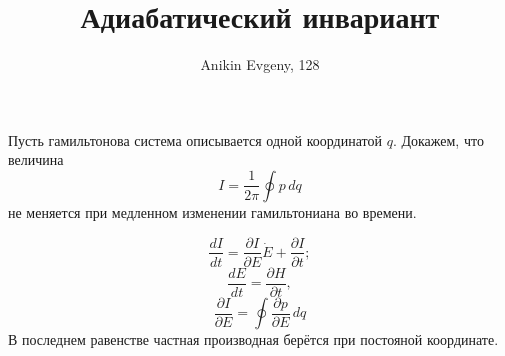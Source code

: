 \documentclass{article}
\title{Адиабатический инвариант}
\author{Anikin Evgeny, 128}
\begin{document}
\maketitle
Пусть гамильтонова система описывается одной координатой $q$. Докажем, что величина
\begin{equation}
	I = \frac{1}{2\pi} \oint p\,dq
\end{equation}
не меняется при медленном изменении гамильтониана во времени. 

\begin{equation}
	\frac{dI}{dt} = \frac{\partial I}{\partial E} \dot{E} + \frac{\partial I}{\partial t};
\end{equation}
\begin{equation}
	\frac{dE}{dt} = \frac{\partial H}{\partial t},
\end{equation}
\begin{equation}
	\frac{\partial I}{\partial E} = \oint \frac{\partial p}{\partial E} \,dq
\end{equation}
В последнем равенстве частная производная берётся при постояной координате.
\end{document}
